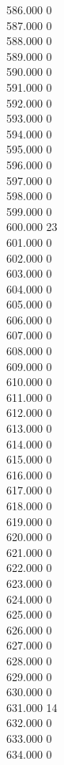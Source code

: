 { 586.000	0 \\
 587.000	0 \\
 588.000	0 \\
 589.000	0 \\
 590.000	0 \\
 591.000	0 \\
 592.000	0 \\
 593.000	0 \\
 594.000	0 \\
 595.000	0 \\
 596.000	0 \\
 597.000	0 \\
 598.000	0 \\
 599.000	0 \\
 600.000	23 \\
 601.000	0 \\
 602.000	0 \\
 603.000	0 \\
 604.000	0 \\
 605.000	0 \\
 606.000	0 \\
 607.000	0 \\
 608.000	0 \\
 609.000	0 \\
 610.000	0 \\
 611.000	0 \\
 612.000	0 \\
 613.000	0 \\
 614.000	0 \\
 615.000	0 \\
 616.000	0 \\
 617.000	0 \\
 618.000	0 \\
 619.000	0 \\
 620.000	0 \\
 621.000	0 \\
 622.000	0 \\
 623.000	0 \\
 624.000	0 \\
 625.000	0 \\
 626.000	0 \\
 627.000	0 \\
 628.000	0 \\
 629.000	0 \\
 630.000	0 \\
 631.000	14 \\
 632.000	0 \\
 633.000	0 \\
 634.000	0 \\
}
